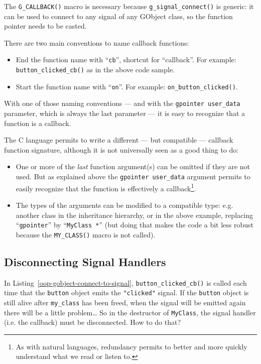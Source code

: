 The \lstinline{G_CALLBACK()} macro is necessary because \lstinline{g_signal_connect()} is generic: it can be used to connect to any signal of any GObject class, so the function pointer needs to be casted.

There are two main conventions to name callback functions:
\begin{itemize}
  \item End the function name with ``\lstinline{cb}'', shortcut for ``callback''. For example: \lstinline{button_clicked_cb()} as in the above code sample.
  \item Start the function name with ``\lstinline{on}''. For example: \lstinline{on_button_clicked()}.
\end{itemize}

With one of those naming conventions --- and with the \lstinline{gpointer user_data} parameter, which is always the last parameter --- it is easy to recognize that a function is a callback.

The C language permits to write a different --- but compatible --- callback function signature, although it is not universally seen as a good thing to do:
\begin{itemize}
  \item One or more of the \emph{last} function argument(s) can be omitted if they are not used. But as explained above the \lstinline{gpointer user_data} argument permits to easily recognize that the function is effectively a callback\footnote{As with natural languages, redundancy permits to better and more quickly understand what we read or listen to.}.
  \item The types of the arguments can be modified to a compatible type: e.g. another class in the inheritance hierarchy, or in the above example, replacing ``\lstinline{gpointer}'' by ``\lstinline{MyClass *}'' (but doing that makes the code a bit less robust because the \lstinline{MY_CLASS()} macro is not called).
\end{itemize}

\subsection{Disconnecting Signal Handlers}

In Listing~\ref{oop-gobject-connect-to-signal}, \lstinline{button_clicked_cb()} is called each time that the \lstinline{button} object emits the \lstinline{"clicked"} signal. If the \lstinline{button} object is still alive after \lstinline{my_class} has been freed, when the signal will be emitted again there will be a little problem… So in the destructor of \lstinline{MyClass}, the signal handler (i.e. the callback) must be disconnected. How to do that?

